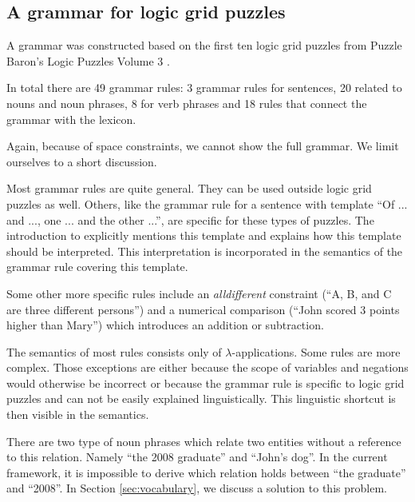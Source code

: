 \subsection{A grammar for logic grid puzzles}
A grammar was constructed based on the first ten logic grid puzzles from Puzzle Baron's Logic Puzzles Volume 3 \cite{logigrammen}.

In total there are 49 grammar rules: 3 grammar rules for sentences, 20 related to nouns and noun phrases, 8 for verb phrases and 18 rules that connect the grammar with the lexicon.

Again, because of space constraints, we cannot show the full grammar. We limit ourselves to a short discussion.

Most grammar rules are quite general. They can be used outside logic grid puzzles as well. Others, like the grammar rule for a sentence with template ``Of ... and ..., one ... and the other ...'', are specific for these types of puzzles. The introduction to \cite{logigrammen} explicitly mentions this template and explains how this template should be interpreted. This interpretation is incorporated in the semantics of the grammar rule covering this template.

Some other more specific rules include an \textit{alldifferent} constraint (``A, B, and C are three different persons'') and a numerical comparison (``John scored 3 points higher than Mary'') which introduces an addition or subtraction.

The semantics of most rules consists only of $\lambda$-applications. Some rules are more complex. Those exceptions are either because the scope of variables and negations would otherwise be incorrect or because the grammar rule is specific to logic grid puzzles and can not be easily explained linguistically. This linguistic shortcut is then visible in the semantics.

There are two type of noun phrases which relate two entities without a reference to this relation. Namely ``the 2008 graduate'' and ``John's dog''. In the current framework, it is impossible to derive which relation holds between ``the graduate'' and ``2008''. In Section \ref{sec:vocabulary}, we discuss a solution to this problem.
